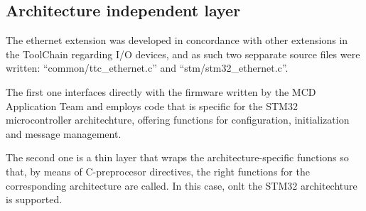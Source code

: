 \subsection {Architecture independent layer}
\label{eth_arch}

The ethernet extension was developed in concordance with other extensions in the ToolChain regarding I/O devices, and as such two sepparate source files were written: ``common/ttc\_ethernet.c'' and ``stm/stm32\_ethernet.c''.

The first one interfaces directly with the firmware written by the MCD Application Team and employs code that is specific for the STM32 microcontroller architechture, offering functions for configuration, initialization and message management.

The second one is a thin layer that wraps the architecture-specific functions so that, by means of C-preprocesor directives, the right functions for the corresponding architecture are called. In this case, onlt the STM32 architechture is supported.



